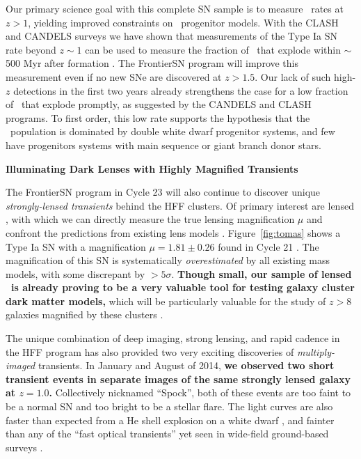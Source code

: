 \documentclass[12pt]{article}
\begin{document}
Our primary science goal with this complete SN sample is to measure
\SNIa\ rates at $z>1$, yielding improved constraints on
\SNIa\ progenitor models.  With the CLASH and CANDELS surveys we have
shown that measurements of the Type Ia SN rate beyond $z\sim1$ can be
used to measure the fraction of \SNeIa\ that explode within $\sim$500
Myr after formation \citep{Graur:2014,Rodney:2014}.  The FrontierSN
program will improve this measurement even if no new SNe are
discovered at $z>1.5$.  Our lack of such high-$z$ detections in the
first two years already strengthens the case for a low fraction of
\SNeIa\ that explode promptly, as suggested by the CANDELS and CLASH
programs.  To first order, this low rate supports the hypothesis that
the \SNIa\ population is dominated by double white dwarf progenitor
systems, and few have progenitors systems with main sequence or
giant branch donor stars.

\centerline {\bf Illuminating Dark Lenses with Highly Magnified Transients} 
\medskip

The FrontierSN program in Cycle 23 will also continue to discover
unique {\it strongly-lensed transients} behind the HFF clusters. Of
primary interest are lensed \SNeIa, with which we can directly
measure the true lensing magnification $\mu$ and confront the
predictions from existing lens models
\citep{Riehm:2011,Patel:2014,Nordin:2014}.  Figure~\ref{fig:tomas}
shows a Type Ia SN with a magnification
$\mu=1.81\pm0.26$ found in Cycle 21 \citep{Rodney:2015b}.  The
magnification of this SN is systematically {\it overestimated} by all
existing mass models, with some discrepant by $>5\sigma$.
{\bf Though small, our sample of lensed \SNeIa\ is already proving to be
  a very valuable tool for testing galaxy cluster dark matter models,}
which will be particularly valuable for the study of $z>8$ galaxies
magnified by these clusters
\citep[e.g.][]{Zheng:2012,Coe:2013,Bouwens:2014,Zitrin:2014}.

The unique combination of deep imaging, strong lensing, and rapid
cadence in the HFF program has also provided two very
exciting discoveries of {\it multiply-imaged} transients.  In January
and August of 2014, {\bf we observed two short transient events in
  separate images of the same strongly lensed galaxy at $z=1.0$.}
Collectively nicknamed ``Spock'', both of these events are too faint
to be a normal SN and too bright to be a stellar flare.  The light
curves are also faster than expected from a He shell explosion on a
white dwarf \citep[a ``.Ia'' event][]{Bildsten:2007,Shen:2010}, and
fainter than any of the ``fast optical transients'' yet seen in
wide-field ground-based surveys
\citep[e.g.][]{Kasliwal:2010,Poznanski:2010,Ofek:2010,Drout:2014,Vinko:2015}.
\end{document}
